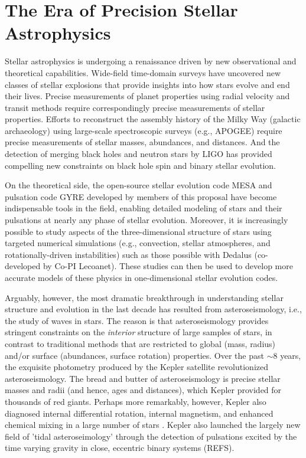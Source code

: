 \section{The Era of Precision Stellar Astrophysics}

Stellar astrophysics is undergoing a renaissance driven by new observational and theoretical capabilities. Wide-field time-domain surveys have uncovered new classes of stellar explosions that provide insights into how stars evolve and end their lives.  Precise measurements of planet properties using radial velocity and transit methods require correspondingly precise measurements of stellar properties. Efforts to reconstruct the assembly history of the Milky Way (galactic archaeology) using large-scale spectroscopic surveys (e.g., APOGEE) require precise measurements of stellar masses, abundances, and distances. And the detection of merging black holes and neutron stars by LIGO has provided compelling new constraints on black hole spin and binary stellar evolution.   

On the theoretical side, the open-source stellar evolution code MESA and pulsation code GYRE developed by members of this proposal have become indispensable tools in the field, enabling detailed modeling of stars and their pulsations at nearly any phase of stellar evolution.  Moreover, it is increasingly possible to study aspects of the three-dimensional structure of stars using targeted numerical simulations (e.g., convection, stellar atmospheres, and rotationally-driven instabilities) such as those possible with Dedalus (co-developed by Co-PI Lecoanet). These studies can then be used to develop more accurate models of these physics in one-dimensional stellar evolution codes.

Arguably, however, the most dramatic breakthrough in understanding stellar structure and evolution in the last decade has resulted from asteroseismology, i.e., the study of waves in stars.  The reason is that asteroseismology provides stringent constraints on the {\em interior} structure of large samples of stars, in contrast to traditional methods that are restricted to global (mass, radius) and/or surface (abundances, surface rotation) properties. Over the past $\sim 8$ years, the exquisite photometry produced by the Kepler satellite revolutionized asteroseismology.  The bread and butter of asteroseismology is precise stellar masses and radii (and hence, ages and distances), which Kepler provided for thousands of red giants. Perhaps more remarkably, however, Kepler also diagnosed internal differential rotation, internal magnetism, and enhanced chemical mixing in a large number of stars .  Kepler also launched the largely new field of 'tidal asteroseimology' through the detection of pulsations excited by the time varying gravity in close, eccentric binary systems (REFS). 


